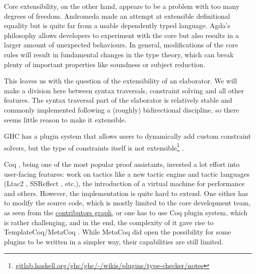 Core extensibility, on the other hand, appears to be a problem with too
many degrees of freedom. Andromeda
\citep{bauerDesignImplementationAndromeda2018, bauerEqualityCheckingGeneral2020}
made an attempt at extensible definitional equality but is quite far
from a usable dependently typed language. Agda's philosophy allows
developers to experiment with the core but also results in a larger
amount of unexpected behaviours. In general, modifications of the core
rules will result in fundamental changes in the type theory, which can
break plenty of important properties like soundness or subject
reduction.

This leaves us with the question of the extensibility of an elaborator.
We will make a division here between syntax traversals, constraint
solving and all other features. The syntax traversal part of the
elaborator is relatively stable and commonly implemented following a
(roughly) bidirectional
discipline\citep{norellPracticalProgrammingLanguage2007, tassiBiDirectionalRefinementAlgorithm2012, ferreiraBidirectionalElaborationDependently2014},
so there seems little reason to make it extensible.

GHC has a plugin system that allows users to dynamically add custom
constraint solvers, but the type of constraints itself is not
extensible\footnote{\href{https://gitlab.haskell.org/ghc/ghc/-/wikis/plugins/type-checker/notes}{gitlab.haskell.org/ghc/ghc/-/wikis/plugins/type-checker/notes}}
\citep{peytonjonesTypeInferenceConstraint2019, vytiniotisOutsideInModularType2011, peytonjonesPracticalTypeInference2007}.

Coq \citep{thecoqdevelopmentteamCoqProofAssistant2022}, being one of the
most popular proof assistants, invested a lot effort into user-facing
features: work on tactics like a new tactic engine
\citep{spiwackVerifiedComputingHomological2011} and tactic languages
(Ltac2 \citep{pedrotLtac2TacticalWarfare2019}, SSReflect
\citep{gonthierSmallScaleReflection2008}, etc.), the introduction of a
virtual machine for performance
\citep{gregoireCompiledImplementationStrong2002} and others. However,
the implementation is quite hard to extend. One either has to modify the
source code, which is mostly limited to the core development team, as
seen from the
\href{https://github.com/coq/coq/graphs/contributors}{contributors
graph}, or one has to use Coq plugin system, which is rather
challenging, and in the end, the complexity of it gave rise to 
TemplateCoq/MetaCoq  .
While MetaCoq did open the possibility for some plugins
\citep{nielsenFormalisingDecentralisedExchanges2023, liesnikovGeneratingInductionPrinciples2020, forsterCertifyingExtractionTime2019}
to be written in a simpler way, their capabilities are still limited.

